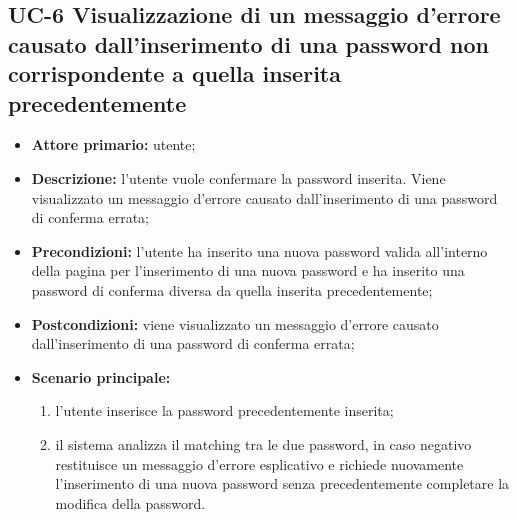 \subsection{UC-6 Visualizzazione di un messaggio d'errore causato dall'inserimento di una password non corrispondente a quella inserita precedentemente}
\begin{itemize}
	\item \textbf{Attore primario:} utente;

	\item\textbf{Descrizione:} l'utente vuole confermare la password inserita. Viene visualizzato un messaggio d'errore causato dall'inserimento di una password di conferma errata;

	\item\textbf{Precondizioni:} l'utente ha inserito una nuova password valida all'interno della pagina per l'inserimento di una nuova password e ha inserito una password di conferma diversa da quella inserita precedentemente;

	\item\textbf{Postcondizioni:} viene visualizzato un messaggio d'errore causato dall'inserimento di una password di conferma errata;

	\item \textbf{Scenario principale:}
	      \begin{enumerate}
		      \item l'utente inserisce la password precedentemente inserita;
		      \item il sistema analizza il matching tra le due password, in caso negativo restituisce un messaggio d'errore esplicativo e richiede nuovamente l'inserimento di una nuova password senza precedentemente completare la modifica della password.
	      \end{enumerate}
\end{itemize}

